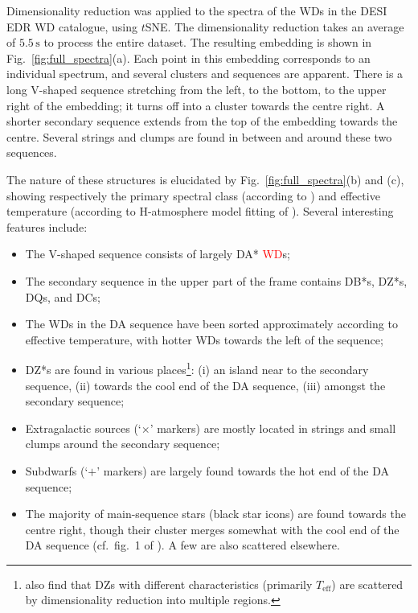 \documentclass[fleqn,usenatbib]{mnras}
\def\Teff{T_\mathrm{eff}}
\newcommand{\red}[1]{\textcolor{red}{#1}}
\begin{document}
Dimensionality reduction was applied to the spectra of the WDs in the DESI EDR WD catalogue, using $t$SNE.
The dimensionality reduction takes an average of $5.5\,\text{s}$ to process the entire dataset.
The resulting embedding is shown in Fig.~\ref{fig:full_spectra}(a).
Each point in this embedding corresponds to an individual spectrum, and several clusters and sequences are apparent.
There is a long V-shaped sequence stretching from the left, to the bottom, to the upper right of the embedding; it turns off into a cluster towards the centre right.
A shorter secondary sequence extends from the top of the embedding towards the centre.
Several strings and clumps are found in between and around these two sequences.

The nature of these structures is elucidated by Fig.~\ref{fig:full_spectra}(b) and (c), showing respectively the primary spectral class (according to \citealt{manser24}) and effective temperature (according to H-atmosphere model fitting of \citealt{gentilefusillo19}).
Several interesting features include:
\begin{itemize}
\item
The V-shaped sequence consists of largely DA* \red{WD}s;
\item
The secondary sequence in the upper part of the frame contains DB*s, DZ*s, DQs, and DCs;
\item
The WDs in the DA sequence have been sorted approximately according to effective temperature, with hotter WDs towards the left of the sequence;
\item
DZ*s are found in various places\footnote{
    \citet{kao24} also find that DZs with different characteristics (primarily $\Teff$) are scattered by dimensionality reduction into multiple regions.
}: (i) an island near to the secondary sequence, (ii) towards the cool end of the DA sequence, (iii) amongst the secondary sequence;
\item
Extragalactic sources (`$\times$' markers) are mostly located in strings and small clumps around the secondary sequence;
\item 
Subdwarfs (`$+$' markers) are largely found towards the hot end of the DA sequence;
\item
The majority of main-sequence stars (black star icons) are found towards the centre right, though their cluster merges somewhat with the cool end of the DA sequence (cf.\ fig.~1 of \citealt{eisenstein06}).
A few are also scattered elsewhere.
\end{itemize}
\end{document}
